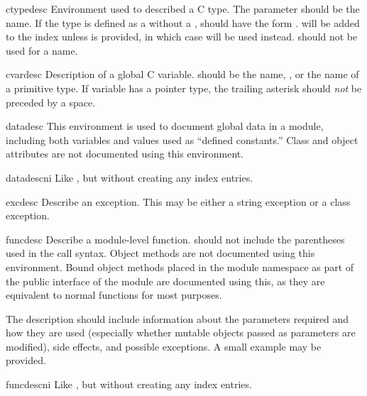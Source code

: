 \documentclass{howto}
\begin{document}
    \begin{envdesc}{ctypedesc}{}
      Environment used to described a C type.  The 
      parameter should be the  name.  If the type is
      defined as a  without a ,
       should have the form .
       will be added to the index unless  is
      provided, in which case  will be used instead.
       should not be used for a  name.
    \end{envdesc}

    \begin{envdesc}{cvardesc}{}
      Description of a global C variable.   should be the
       name, , or the name of
      a primitive type.  If variable has a pointer type, the trailing
      asterisk should \emph{not} be preceded by a space.
    \end{envdesc}

    \begin{envdesc}{datadesc}{}
      This environment is used to document global data in a module,
      including both variables and values used as ``defined
      constants.''  Class and object attributes are not documented
      using this environment.
    \end{envdesc}
    \begin{envdesc}{datadescni}{}
      Like , but without creating any index entries.
    \end{envdesc}

    \begin{envdesc}{excdesc}{}
      Describe an exception.  This may be either a string exception or
      a class exception.
    \end{envdesc}

    \begin{envdesc}{funcdesc}{}
      Describe a module-level function.   should
      not include the parentheses used in the call syntax.  Object
      methods are not documented using this environment.  Bound object
      methods placed in the module namespace as part of the public
      interface of the module are documented using this, as they are
      equivalent to normal functions for most purposes.

      The description should include information about the parameters
      required and how they are used (especially whether mutable
      objects passed as parameters are modified), side effects, and
      possible exceptions.  A small example may be provided.
    \end{envdesc}
    \begin{envdesc}{funcdescni}{}
      Like , but without creating any index entries.
    \end{envdesc}
\end{document}
